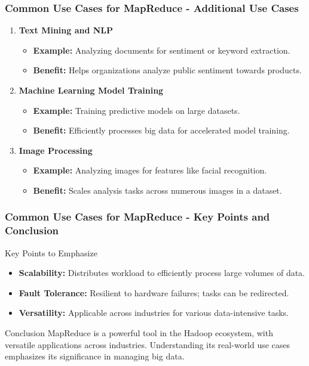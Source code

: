 \documentclass[aspectratio=169]{beamer}
\begin{document}
\begin{frame}[fragile]
    \frametitle{Common Use Cases for MapReduce - Additional Use Cases}
    \begin{enumerate}[resume]
        \item \textbf{Text Mining and NLP}
        \begin{itemize}
            \item \textbf{Example:} Analyzing documents for sentiment or keyword extraction.
            \item \textbf{Benefit:} Helps organizations analyze public sentiment towards products.
        \end{itemize}

        \item \textbf{Machine Learning Model Training}
        \begin{itemize}
            \item \textbf{Example:} Training predictive models on large datasets.
            \item \textbf{Benefit:} Efficiently processes big data for accelerated model training.
        \end{itemize}

        \item \textbf{Image Processing}
        \begin{itemize}
            \item \textbf{Example:} Analyzing images for features like facial recognition.
            \item \textbf{Benefit:} Scales analysis tasks across numerous images in a dataset.
        \end{itemize}
    \end{enumerate}
\end{frame}

\begin{frame}[fragile]
    \frametitle{Common Use Cases for MapReduce - Key Points and Conclusion}
    \begin{block}{Key Points to Emphasize}
        \begin{itemize}
            \item \textbf{Scalability:} Distributes workload to efficiently process large volumes of data.
            \item \textbf{Fault Tolerance:} Resilient to hardware failures; tasks can be redirected.
            \item \textbf{Versatility:} Applicable across industries for various data-intensive tasks.
        \end{itemize}
    \end{block}

    \begin{block}{Conclusion}
        MapReduce is a powerful tool in the Hadoop ecosystem, with versatile applications across industries. Understanding its real-world use cases emphasizes its significance in managing big data.
    \end{block}
\end{frame}
\end{document}

